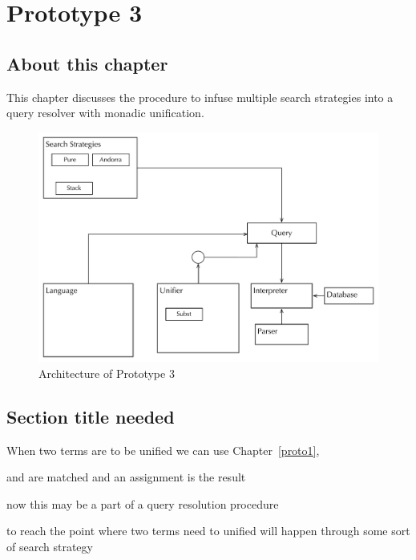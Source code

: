 \documentclass[thesis-solanki.tex]{files}
\begin{document}
\chapter{Prototype 3}{\label{proto3}}


\section{About this chapter}
This chapter discusses the procedure to infuse multiple search strategies into a  query resolver with monadic unification. 


\begin{figure}
  \includegraphics[width=1\textwidth]{Prototype-3-diagram.pdf}
\vspace*{-1cm}
  \caption{Architecture of Prototype 3}
  \label{fig:architecture-proto-3}
\end{figure}


\section{Section title needed}
When two terms are to be unified we can use Chapter~\ref{proto1},

 and  are matched and an assignment is the result 

now this may be a part of a query resolution procedure

to reach the point where two terms need to unified will happen through some sort of search strategy
\end{document}
